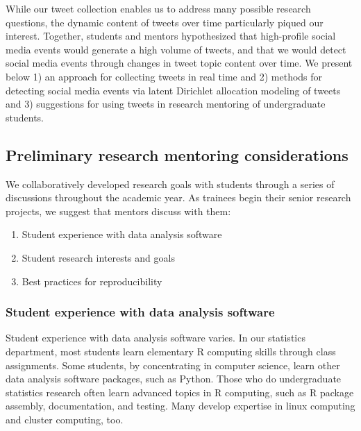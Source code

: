 \documentclass[
]{article}
\providecommand{\tightlist}{%
  \setlength{\itemsep}{0pt}\setlength{\parskip}{0pt}}
\begin{document}
While our tweet collection enables us to address many possible research
questions, the dynamic content of tweets over time particularly piqued
our interest. Together, students and mentors hypothesized that
high-profile social media events would generate a high volume of tweets,
and that we would detect social media events through changes in tweet
topic content over time. We present below 1) an approach for collecting
tweets in real time and 2) methods for detecting social media events via
latent Dirichlet allocation modeling of tweets and 3) suggestions for
using tweets in research mentoring of undergraduate students.

\hypertarget{preliminary-research-mentoring-considerations}{%
\subsection{Preliminary research mentoring
considerations}\label{preliminary-research-mentoring-considerations}}

We collaboratively developed research goals with students through a
series of discussions throughout the academic year. As trainees begin
their senior research projects, we suggest that mentors discuss with
them:

\begin{enumerate}
\def\labelenumi{\arabic{enumi}.}
\tightlist
\item
  Student experience with data analysis software
\item
  Student research interests and goals
\item
  Best practices for reproducibility
\end{enumerate}

\hypertarget{student-experience-with-data-analysis-software}{%
\subsubsection{Student experience with data analysis
software}\label{student-experience-with-data-analysis-software}}

Student experience with data analysis software varies. In our statistics
department, most students learn elementary R computing skills through
class assignments. Some students, by concentrating in computer science,
learn other data analysis software packages, such as Python. Those who
do undergraduate statistics research often learn advanced topics in R
computing, such as R package assembly, documentation, and testing. Many
develop expertise in linux computing and cluster computing, too.
\end{document}
